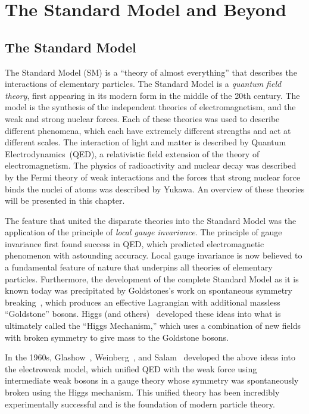 \ifx\master\undefined\fi

\chapter{The Standard Model and Beyond}
\label{ch:theory}

\section{The Standard Model}

The Standard Model (SM) is a ``theory of almost everything'' that describes the
interactions of elementary particles.  The Standard Model is a \emph{quantum
field theory}, first appearing in its modern form in the middle of the 20th
century.  The model is the synthesis of the independent theories of
electromagnetism, and the weak and strong nuclear forces.  Each of these
theories was used to describe different phenomena, which each have extremely
different strengths and act at different scales.  The interaction of light and
matter is described by Quantum Electrodynamics~(QED), a relativistic field
extension of the theory of electromagnetism.  The physics of radioactivity and
nuclear decay was described by the Fermi theory of weak interactions and the
forces that strong nuclear force binds the nuclei of atoms was described by
Yukawa.  An overview of these theories will be presented in this chapter.  

The feature that united the disparate theories into the Standard Model was the
application of the principle of \emph{local gauge invariance}. The principle of
gauge invariance first found success in QED, which predicted electromagnetic
phenomenon with astounding accuracy.  Local gauge invariance is now believed to
a fundamental feature of nature that underpins all theories of elementary
particles.  Furthermore, the development of the complete Standard Model as it is
known today was precipitated by Goldstones's work on spontaneous symmetry
breaking~\cite{Goldstone:1961eq,PhysRev.127.965}, which produces an effective
Lagrangian with additional massless ``Goldstone'' bosons.  Higgs (and
others)~\cite{PhysRevLett.13.321, PhysRevLett.13.508,PhysRevLett.13.585}
developed these ideas into what is ultimately called the ``Higgs Mechanism,''
which uses a combination of new fields with broken symmetry to give mass to the
Goldstone bosons.

In the 1960s, Glashow~\cite{Glashow:1961tr}, Weinberg~\cite{Weinberg:1967tq}, 
and Salam~\cite{Salam:1968rm} developed the above ideas into the
electroweak model, which unified QED with the weak force using intermediate weak
bosons in a gauge theory whose symmetry was spontaneously broken using the Higgs
mechanism.  This unified theory has been incredibly experimentally successful
and is the foundation of modern particle theory.

